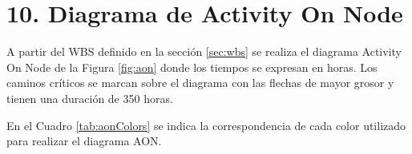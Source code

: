 \documentclass[
11pt, %
]{charter}
\begin{document}
%
%
%
%

\section{10. Diagrama de Activity On Node}
\label{sec:AoN}

A partir del WBS definido en la sección \ref{sec:wbs} se realiza el diagrama Activity On Node de la Figura \ref{fig:aon} donde los tiempos se expresan en horas. Los caminos críticos se marcan sobre el diagrama con las flechas de mayor grosor y tienen una duración de 350 horas.

En el Cuadro \ref{tab:aonColors} se indica la correspondencia de cada color utilizado para realizar el diagrama AON.
\end{document}
